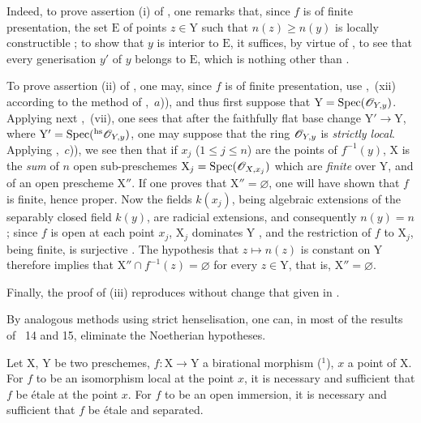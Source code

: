 Indeed, to prove assertion (i) of , one remarks that, since $f$ is of finite presentation, the set $\mathrm{E}$ of points $z\in\mathrm{Y}$ such that $n(z)\geq n(y)$ is locally constructible ; to show that $y$ is interior to $\mathrm{E}$, it suffices, by virtue of , to see that every generisation $y'$ of $y$ belongs to $\mathrm{E}$, which is nothing other than .

To prove assertion (ii) of , one may, since $f$ is of finite presentation, use ,~(xii) according to the method of ,~$a$)), and thus first suppose that $\mathrm{Y}=\operatorname{Spec}(\mathscr{O}_{Y,y})$. Applying next ,~(vii), one sees that after the faithfully flat base change $\mathrm{Y}'\to\mathrm{Y}$, where $\mathrm{Y}'=\operatorname{Spec}({}^{\mathrm{hs}}\mathscr{O}_{Y,y})$, one may suppose that the ring $\mathscr{O}_{Y,y}$ is \emph{strictly local}.
Applying ,~$c$)), we see then that if $x_j$ ($1\leq j\leq n$) are the points of $f^{-1}(y)$, $\mathrm{X}$ is the \emph{sum} of $n$ open sub-preschemes $\mathrm{X}_j=\operatorname{Spec}(\mathscr{O}_{X,x_j})$ which are \emph{finite} over $\mathrm{Y}$, and of an open prescheme $\mathrm{X}''$.
If one proves that $\mathrm{X}''=\varnothing$, one will have shown that $f$ is finite, hence proper. Now the fields $k(x_j)$, being algebraic extensions of the separably closed field $k(y)$, are radicial extensions, and consequently $n(y)=n$; since $f$ is open at each point $x_j$, $\mathrm{X}_j$ dominates $\mathrm{Y}$ , and the restriction of $f$ to $\mathrm{X}_j$, being finite, is surjective . The hypothesis that $z\mapsto n(z)$ is constant on $\mathrm{Y}$ therefore implies that $\mathrm{X}''\cap f^{-1}(z)=\varnothing$ for every $z\in\mathrm{Y}$, that is, $\mathrm{X}''=\varnothing$.

Finally, the proof of (iii) reproduces without change that given in .

\begin{env}[18.10.17.2]
\label{IV.18.10.17.2}
By analogous methods using strict henselisation, one can, in most of the results of \textsection\textsection~14 and 15, eliminate the Noetherian hypotheses.
\end{env}

\begin{lemma}[18.10.18]
\label{IV.18.10.18}
Let $\mathrm{X}$, $\mathrm{Y}$ be two preschemes, $f:\mathrm{X}\to\mathrm{Y}$ a birational morphism (${}^1$), $x$ a point of $\mathrm{X}$.
For $f$ to be an isomorphism local at the point $x$, it is necessary and sufficient that $f$ be \'etale at the point $x$.
For $f$ to be an open immersion, it is necessary and sufficient that $f$ be \'etale and separated.
\end{lemma}

